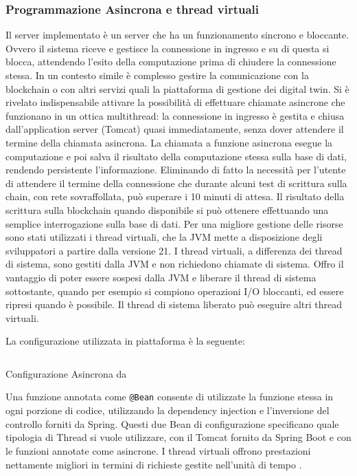 \documentclass[a4paper,11pt]{article}
\newenvironment{longlisting}{\captionsetup{type=figure,labelformat=custom}}{}
\begin{document}
\subsubsection{Programmazione Asincrona e thread virtuali}
Il server implementato è un server che ha un funzionamento sincrono e bloccante. Ovvero il sistema riceve e gestisce la connessione in ingresso e su di questa si blocca, attendendo l'esito della computazione prima di chiudere la connessione stessa. In un contesto simile è complesso gestire la comunicazione con la blockchain o con altri servizi quali la piattaforma di gestione dei digital twin. Si è rivelato indispensabile attivare la possibilità di effettuare chiamate asincrone che funzionano in un ottica multithread: la connessione in ingresso è gestita e chiusa dall'application server (Tomcat) quasi immediatamente, senza dover attendere il termine della chiamata asincrona. La chiamata a funzione asincrona esegue la computazione e poi salva il risultato della computazione stessa sulla base di dati, rendendo persistente l'informazione. Eliminando di fatto la necessità per l'utente di attendere il termine della connessione che durante alcuni test di scrittura sulla chain, con rete sovraffollata, può superare i 10 minuti di attesa. Il risultato della scrittura sulla blockchain quando disponibile si può ottenere effettuando una semplice interrogazione sulla base di dati. Per una migliore gestione delle risorse sono stati utilizzati i thread virtuali, che la JVM mette a disposizione degli sviluppatori a partire dalla versione 21. I thread virtuali, a differenza dei thread di sistema, sono gestiti dalla JVM e non richiedono chiamate di sistema. Offro il vantaggio di poter essere sospesi dalla JVM e liberare il thread di sistema sottostante,  quando per esempio si compiono operazioni I/O bloccanti, ed essere ripresi quando è possibile. Il thread di sistema liberato può eseguire altri thread virtuali. \cite{oraclevirtualthread}

La configurazione utilizzata in piattaforma è la seguente:


\begin{longlisting}
  \inputminted{java}{./code/async.spring.java}
  \caption{Configurazione Asincrona da \cite{baeldungWorkingWith}}
  \label{listing:asyncconfig}
\end{longlisting}

Una funzione annotata come \texttt{@Bean} consente di utilizzate la funzione stessa in ogni porzione di codice, utilizzando la dependency injection e l'inversione del controllo forniti da Spring.
Questi due Bean di configurazione specificano quale tipologia di Thread si vuole utilizzare, con il Tomcat fornito da Spring Boot e con le funzioni annotate come asincrone.
I thread virtuali offrono prestazioni nettamente migliori in termini di richieste gestite nell'unità di tempo \cite{baeldungWorkingWith}.
\end{document}
